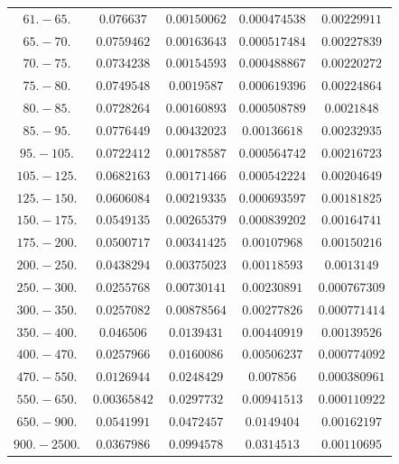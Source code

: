 \documentclass[11pt]{article}
\begin{document}
\begin{table}[htbp]
{\begin{tabular}{ccccc}
		$61.-65.$ & $0.076637$ & $0.00150062$ & $0.000474538$ & $0.00229911$ \\
		$65.-70.$ & $0.0759462$ & $0.00163643$ & $0.000517484$ & $0.00227839$ \\
		$70.-75.$ & $0.0734238$ & $0.00154593$ & $0.000488867$ & $0.00220272$ \\
		$75.-80.$ & $0.0749548$ & $0.0019587$ & $0.000619396$ & $0.00224864$ \\
		$80.-85.$ & $0.0728264$ & $0.00160893$ & $0.000508789$ & $0.0021848$ \\
		$85.-95.$ & $0.0776449$ & $0.00432023$ & $0.00136618$ & $0.00232935$ \\
		$95.-105.$ & $0.0722412$ & $0.00178587$ & $0.000564742$ & $0.00216723$ \\
		$105.-125.$ & $0.0682163$ & $0.00171466$ & $0.000542224$ & $0.00204649$ \\
		$125.-150.$ & $0.0606084$ & $0.00219335$ & $0.000693597$ & $0.00181825$ \\
		$150.-175.$ & $0.0549135$ & $0.00265379$ & $0.000839202$ & $0.00164741$ \\
		$175.-200.$ & $0.0500717$ & $0.00341425$ & $0.00107968$ & $0.00150216$ \\
		$200.-250.$ & $0.0438294$ & $0.00375023$ & $0.00118593$ & $0.0013149$ \\
		$250.-300.$ & $0.0255768$ & $0.00730141$ & $0.00230891$ & $0.000767309$ \\
		$300.-350.$ & $0.0257082$ & $0.00878564$ & $0.00277826$ & $0.000771414$ \\
		$350.-400.$ & $0.046506$ & $0.0139431$ & $0.00440919$ & $0.00139526$ \\
		$400.-470.$ & $0.0257966$ & $0.0160086$ & $0.00506237$ & $0.000774092$ \\
		$470.-550.$ & $0.0126944$ & $0.0248429$ & $0.007856$ & $0.000380961$ \\
		$550.-650.$ & $0.00365842$ & $0.0297732$ & $0.00941513$ & $0.000110922$ \\
		$650.-900.$ & $0.0541991$ & $0.0472457$ & $0.0149404$ & $0.00162197$ \\
		$900.-2500.$ & $0.0367986$ & $0.0994578$ & $0.0314513$ & $0.00110695$ \\
	\bottomrule
	\end{tabular}
}
\end{table}
\end{document}
